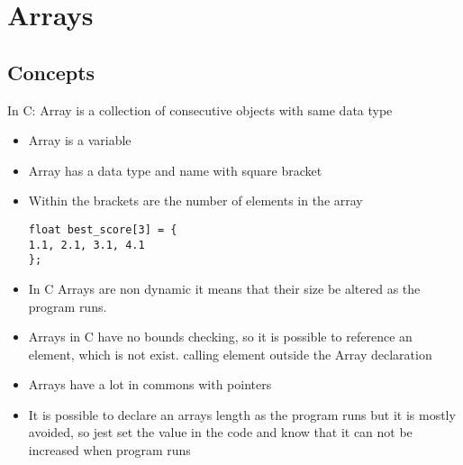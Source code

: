 \section{Arrays}
\subsection{Concepts}

In C: Array is a collection of consecutive objects with same data type
\begin{itemize}
    \item Array is a variable
    \item Array has a data type and name with square bracket
    \item Within the brackets are the number of elements in the array


\begin{lstlisting} 
float best_score[3] = {
1.1, 2.1, 3.1, 4.1
};
\end{lstlisting}

    \item In C Arrays are non dynamic it means that their size be altered as the program runs.
    \item Arrays in C have no bounds checking, so it is possible to reference an element, which is not exist. calling element outside the Array declaration
    \item Arrays have a lot in commons with pointers
    \item It is possible to declare an arrays length as the program runs but it is mostly avoided, so jest set the value in the code and know that it can not be increased when program runs
    \end{itemize}
    \break
    \break
    
